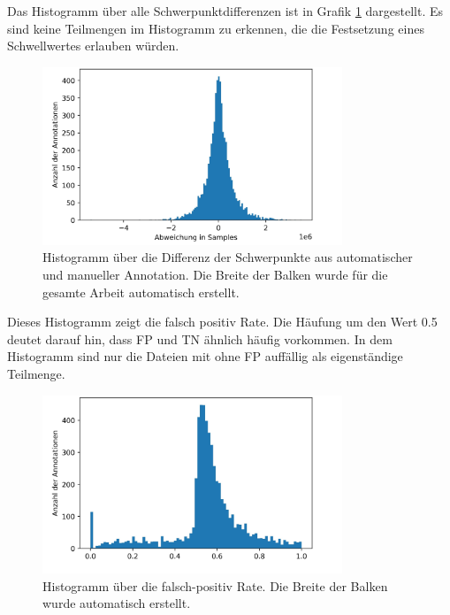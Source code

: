 Das Histogramm über alle Schwerpunktdifferenzen ist in Grafik \ref{fig:centers} dargestellt. Es sind keine Teilmengen im Histogramm zu erkennen, die die Festsetzung eines Schwellwertes erlauben würden.
\begin{figure}[!ht]%
	\begin{center}
	\includegraphics[width=0.80\textwidth]{./Bilder/centers.jpg}
	\end{center}
	\caption{Histogramm über die Differenz der Schwerpunkte aus automatischer und manueller Annotation. Die Breite der Balken wurde für die gesamte Arbeit automatisch erstellt.}%
	\label{fig:centers}%
\end{figure}

Dieses Histogramm zeigt die falsch positiv Rate. Die Häufung um den Wert 0.5 deutet darauf hin, dass FP und TN ähnlich häufig vorkommen. In dem Histogramm sind nur die Dateien mit ohne FP auffällig als eigenständige Teilmenge.

\begin{figure}[!ht]%
	\begin{center}
	\includegraphics[width=0.80\textwidth]{./Bilder/falsch positiv Rate.jpg}
	\end{center}
	\caption{Histogramm über die falsch-positiv Rate. Die Breite der Balken wurde automatisch erstellt.}%
	\label{fig:FPrate}%
\end{figure}
